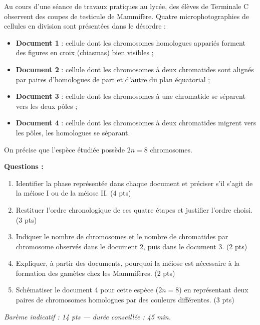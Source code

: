\documentclass[11pt]{article}
\begin{document}
\begin{exercice}
Au cours d'une séance de travaux pratiques au lycée, des élèves de Terminale C observent des coupes de testicule de Mammifère. Quatre microphotographies de cellules en division sont présentées dans le désordre :
\begin{itemize}
\item \textbf{Document 1} : cellule dont les chromosomes homologues appariés forment des figures en croix (chiasmas) bien visibles ;
\item \textbf{Document 2} : cellule dont les chromosomes à deux chromatides sont alignés par paires d'homologues de part et d'autre du plan équatorial ;
\item \textbf{Document 3} : cellule dont les chromosomes à une chromatide se séparent vers les deux pôles ;
\item \textbf{Document 4} : cellule dont les chromosomes à deux chromatides migrent vers les pôles, les homologues se séparant.
\end{itemize}
On précise que l'espèce étudiée possède $2n = 8$ chromosomes.

\textbf{Questions :}
\begin{enumerate}
\item Identifier la phase représentée dans chaque document et préciser s'il s'agit de la méiose I ou de la méiose II. (4 pts)
\item Restituer l'ordre chronologique de ces quatre étapes et justifier l'ordre choisi. (3 pts)
\item Indiquer le nombre de chromosomes et le nombre de chromatides par chromosome observés dans le document 2, puis dans le document 3. (2 pts)
\item Expliquer, à partir des documents, pourquoi la méiose est nécessaire à la formation des gamètes chez les Mammifères. (2 pts)
\item Schématiser le document 4 pour cette espèce ($2n = 8$) en représentant deux paires de chromosomes homologues par des couleurs différentes. (3 pts)
\end{enumerate}
\emph{Barème indicatif : 14 pts — durée conseillée : 45 min.}
\end{exercice}
\end{document}
